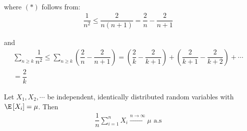 \begin{prf}[]{}
\begin{enumerate}[leftmargin=*]
\begin{equation*}
\begin{gathered}
        \end{gathered}
      \end{equation*}\par
      \noindent where $(*)$ follows from:
      \begin{equation*}
        \begin{gathered}
          \dfrac{1}{n^2}\leq\dfrac{2}{n(n+1)} = \dfrac{2}{n}-\dfrac{2}{n+1}
        \end{gathered}
      \end{equation*}\par
      \noindent and 
      \begin{equation*}
        \begin{gathered}
          \sum_{n\geq k}\dfrac{1}{n^2}\leq \sum_{n\geq k}\left(\dfrac{2}{n}-\dfrac{2}{n+1}\right) = \left(\dfrac{2}{k}-\dfrac{2}{k+1}\right) + \left(\dfrac{2}{k+1}-\dfrac{2}{k+2}\right)+\cdots\\
          = \dfrac{2}{k}
        \end{gathered}
      \end{equation*}
  \end{enumerate}
\end{prf}
\par\bigskip
\begin{theo}{}
  Let $X_1,X_2,\cdots$ be independent, identically distributed random variables with $\E\left[X_i\right] = \mu$. Then
  \begin{equation*}
    \begin{gathered}
      \dfrac{1}{n}\sum_{i=1}^{n}X_i\stackrel{n\to\infty}{\rightarrow}\mu\text{ a.s}
    \end{gathered}
  \end{equation*}
\end{theo}
\par\bigskip
